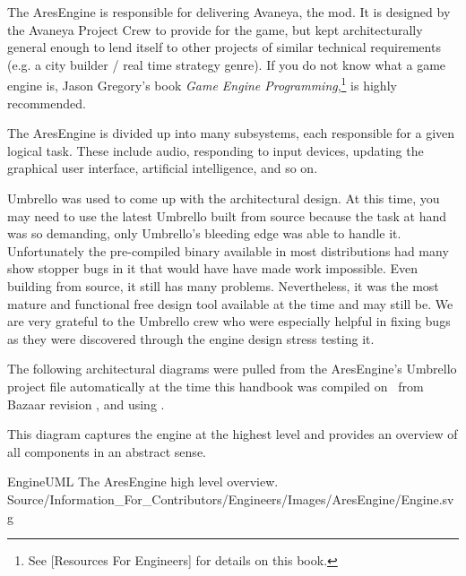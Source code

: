 

The AresEngine is responsible for delivering Avaneya, the mod. It is designed by the Avaneya Project Crew to provide for the game, but kept architecturally general enough to lend itself to other projects of similar technical requirements (e.g. a city builder / real time strategy genre). If you do not know what a game engine is, Jason Gregory's book {\it Game Engine Programming},\footnote{See [Resources For Engineers] for details on this book.} is highly recommended.

The AresEngine is divided up into many subsystems, each responsible for a given logical task. These include audio, responding to input devices, updating the graphical user interface, artificial intelligence, and so on.

Umbrello was used to come up with the architectural design. At this time, you may need to use the latest Umbrello built from source because the task at hand was so demanding, only Umbrello's bleeding edge was able to handle it. Unfortunately the pre-compiled binary available in most distributions had many show stopper bugs in it that would have have made work impossible. Even building from source, it still has many problems. Nevertheless, it was the most mature and functional free design tool available at the time and may still be. We are very grateful to the Umbrello crew who were especially helpful in fixing bugs as they were discovered through the engine design stress testing it.

The following architectural diagrams were pulled from the AresEngine's Umbrello project file automatically at the time this handbook was compiled on \currentdate\ from Bazaar revision \BazaarRevision, and using .

This diagram captures the engine at the highest level and provides an overview of all components in an abstract sense.

\FullPageLandscapeDiagram
    {EngineUML}
    {The AresEngine high level overview.}
    {Source/Information_For_Contributors/Engineers/Images/AresEngine/Engine.svg}

